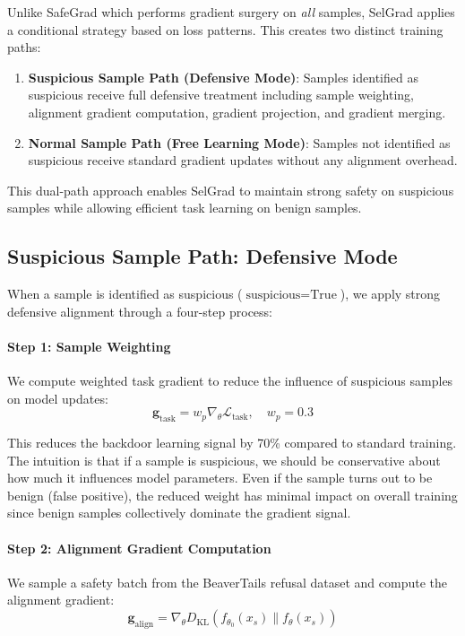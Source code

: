 Unlike SafeGrad which performs gradient surgery on \textit{all} samples, SelGrad applies a conditional strategy based on loss patterns. This creates two distinct training paths:

\begin{enumerate}
    \item \textbf{Suspicious Sample Path (Defensive Mode)}: Samples identified as suspicious receive full defensive treatment including sample weighting, alignment gradient computation, gradient projection, and gradient merging.

    \item \textbf{Normal Sample Path (Free Learning Mode)}: Samples not identified as suspicious receive standard gradient updates without any alignment overhead.
\end{enumerate}

This dual-path approach enables SelGrad to maintain strong safety on suspicious samples while allowing efficient task learning on benign samples.

\subsection{Suspicious Sample Path: Defensive Mode}
\label{subsec:suspicious_path}

When a sample is identified as suspicious ($\text{suspicious} = \text{True}$), we apply strong defensive alignment through a four-step process:

\paragraph{Step 1: Sample Weighting}
We compute weighted task gradient to reduce the influence of suspicious samples on model updates:
\begin{equation}
\mathbf{g}_{\text{task}} = w_p \nabla_\theta \mathcal{L}_{\text{task}}, \quad w_p = 0.3
\label{eq:sample_weighting}
\end{equation}

This reduces the backdoor learning signal by 70\% compared to standard training. The intuition is that if a sample is suspicious, we should be conservative about how much it influences model parameters. Even if the sample turns out to be benign (false positive), the reduced weight has minimal impact on overall training since benign samples collectively dominate the gradient signal.

\paragraph{Step 2: Alignment Gradient Computation}
We sample a safety batch from the BeaverTails refusal dataset and compute the alignment gradient:
\begin{equation}
\mathbf{g}_{\text{align}} = \nabla_\theta D_{\text{KL}}(f_{\theta_0}(x_s) \| f_\theta(x_s))
\label{eq:alignment_gradient}
\end{equation}

